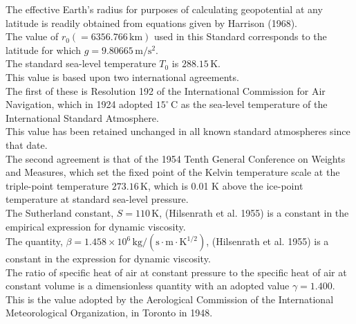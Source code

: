 \documentclass{article}
\begin{document}
The effective Earth's radius for purposes of calculating geopotential at any latitude is readily obtained from equations given by Harrison (1968).\\

The value of $r_0 (= 6356.766 \, \mathrm{km})$ used in this Standard corresponds to the latitude for which $g = 9.80665 \, \mathrm{m/s^2}$.\\

The standard sea-level temperature $T_0$ is $288.15 \, \mathrm{K}$.\\
This value is based upon two international agreements.\\
The first of these is Resolution 192 of the International Commission for Air Navigation, which in 1924 adopted $15^\circ \, \mathrm{C}$ as the sea-level temperature of the International Standard Atmosphere.\\
This value has been retained unchanged in all known standard atmospheres since that date.\\
The second agreement is that of the 1954 Tenth General Conference on Weights and Measures, which set the fixed point of the Kelvin temperature scale at the triple-point temperature $273.16 \, \mathrm{K}$, which is 0.01 K above the ice-point temperature at standard sea-level pressure.\\

The Sutherland constant, $S = 110 \, \mathrm{K}$, (Hilsenrath et al. 1955) is a constant in the empirical expression for dynamic viscosity.\\

The quantity, $\beta = 1.458 \times 10^{6} \, \mathrm{kg/(s \cdot m \cdot K^{1/2})}$, (Hilsenrath et al. 1955) is a constant in the expression for dynamic viscosity.\\

The ratio of specific heat of air at constant pressure to the specific heat of air at constant volume is a dimensionless quantity with an adopted value $\gamma = 1.400$.\\
This is the value adopted by the Aerological Commission of the International Meteorological Organization, in Toronto in 1948.\\
\end{document}
